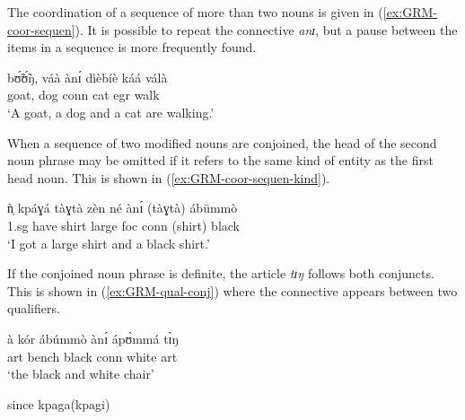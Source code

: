 \begin{exe}
\begin{exe}
\begin{exe}
{\begin{exe}
\begin{exe}
\begin{exe}
\begin{exe}
\begin{exe}
\begin{exe}
\begin{exe}
\begin{xlist}
\begin{exe}
\begin{exe}
\begin{exe}
\begin{exe}
\begin{exe}
\begin{exe}
\begin{exe}
 The coordination of a sequence of
 more than two nouns is given in (\ref{ex:GRM-coor-sequen}). It is possible to
repeat the 
connective {\it anɪ}, but a pause between the items in a
sequence is more
frequently found. 

\begin{exe}
 \ex\label{ex:GRM-coor-sequen} 
 
 \gll  bʊ̃́ʊ̃́ŋ, váà ànɪ́ dìèbíè káá válà \\
 goat,  dog {\sc conn} cat {\sc  egr} walk\\
 \glt   `A goat, a dog and a cat are walking.'
\z

When a sequence of  two  modified nouns are conjoined, the head of the second
noun phrase may be omitted if it refers to the same kind of entity as
the first head noun. This is shown in (\ref{ex:GRM-coor-sequen-kind}).


\begin{exe}
 \ex\label{ex:GRM-coor-sequen-kind}
 
 \gll ǹ̩ kpáɣá tàɣtà zèn né ànɪ́ (tàɣtà) ábūmmò  \\
{\sc 1.sg} have shirt large  {\sc foc} {\sc conn} (shirt)  black \\
 \glt   `I got a large shirt and a black shirt.'
\z

If the conjoined noun phrase is definite, the article {\it tɪŋ}
follows both conjuncts. This is shown in (\ref{ex:GRM-qual-conj}) where the
connective appears between two qualifiers.

\begin{exe}
 \ex\label{ex:GRM-qual-conj}
 
 \gll   à kór ábúmmò ànɪ́ ápʊ̀mmá tɪ̀ŋ\\
{\sc art}  bench black {\sc conn} white {\sc art} \\
 \glt   `the black and white chair'
\z


since
kpaga(kpagi)



\end{exe}
\end{exe}
\end{exe}
\end{exe}
\end{exe}
\end{exe}
\end{exe}
\end{exe}
\end{exe}
\end{exe}
\end{xlist}
\end{exe}
\end{exe}
\end{exe}
\end{exe}
\end{exe}
\end{exe}
\end{exe}}
\end{exe}
\end{exe}
\end{exe}
